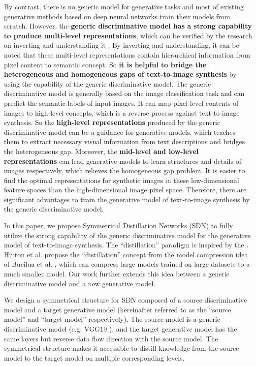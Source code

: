 \documentclass[sigconf]{acmart}
\begin{document}
By contrast, there is no generic model for generative tasks and most of existing generative methods based on deep neural networks train their models from scratch. However, the \textbf{generic discriminative model has a strong capability to produce multi-level representations}, which can be verified by the research on inverting and understanding it \cite{mahendran2015understanding, dosovitskiy2016inverting, zhang2016augmenting}. By inverting and understanding, it can be noted that these multi-level representations contain hierarchical information from pixel content to semantic concept. So \textbf{it is helpful to bridge the heterogeneous and homogeneous gaps of text-to-image synthesis} by using the capability of the generic discriminative model. The generic discriminative model is generally based on the image classification task and can predict the semantic labels of input images. It can map pixel-level contents of images to high-level concepts, which is a reverse process against text-to-image synthesis. So the \textbf{high-level representations} produced by the generic discriminative model can be a guidance for generative models, which teaches them to extract necessary visual information from text descriptions and bridges the heterogeneous gap. Moreover, the \textbf{mid-level and low-level representations} can lead generative models to learn structures and details of images respectively, which relieves the homogeneous gap problem. It is easier to find the optimal representations for synthetic images in these low-dimensional feature spaces than the high-dimensional image pixel space. Therefore, there are significant advantages to train the generative model of text-to-image synthesis by the generic discriminative model.

In this paper, we propose Symmetrical Distillation Networks (SDN) to fully utilize the strong capability of the generic discriminative model for the generative model of text-to-image synthesis. The ``distillation'' paradigm is inspired by the \cite{hinton2015distilling}. Hinton et al. \cite{hinton2015distilling} propose the ``distillation'' concept from the model compression idea of Bucilua et al. \cite{bucilua2006model}, which can compress large models trained on large datasets to a much smaller model. Our work further extends this idea between a generic discriminative model and a new generative model.

We design a symmetrical structure for SDN composed of a source discriminative model and a target generative model (hereinafter referred to as the ``source model'' and ``target model'' respectively). The source model is a generic discriminative model (e.g. VGG19 \cite{simonyan2014very}), and the target generative model has the same layers but reverse data flow direction with the source model. The symmetrical structure makes it accessible to distill knowledge from the source model to the target model on multiple corresponding levels.%
\end{document}
